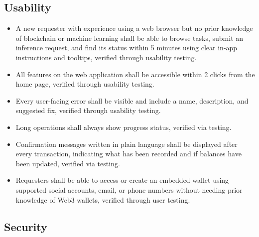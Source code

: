 \documentclass[12pt]{article}
\newcounter{nfrnum} %
\begin{document}
\subsection{Usability}

\noindent \begin{itemize}

\item[NFR\refstepcounter{nfrnum}\thenfrnum \label{NFR_Learnability}:] A new requester with experience using a web browser but no prior knowledge of blockchain or machine learning shall be able to browse tasks, submit an inference request, and find its status within 5 minutes using clear in-app instructions and tooltips, verified through usability testing.

\item[NFR\refstepcounter{nfrnum}\thenfrnum \label{NFR_TwoClickAccess}:] All features on the web application shall be accessible within 2 clicks from the home page, verified through usability testing.

\item[NFR\refstepcounter{nfrnum}\thenfrnum \label{NFR_ErrorVisibility}:] Every user-facing error shall be visible and include a name, description, and suggested fix, verified through usability testing.

\item[NFR\refstepcounter{nfrnum}\thenfrnum \label{NFR_ProgressStatus}:] Long operations shall always show progress status, verified via testing.

\item[NFR\refstepcounter{nfrnum}\thenfrnum \label{NFR_TransactionConfirmation}:] Confirmation messages written in plain language shall be displayed after every transaction, indicating what has been recorded and if balances have been updated, verified via testing.

\item[NFR\refstepcounter{nfrnum}\thenfrnum \label{NFR_EmbeddedWalletAccess}:] Requesters shall be able to access or create an embedded wallet using supported social accounts, email, or phone numbers without needing prior knowledge of Web3 wallets, verified through user testing.

\end{itemize}

\subsection{Security}
\end{document}
